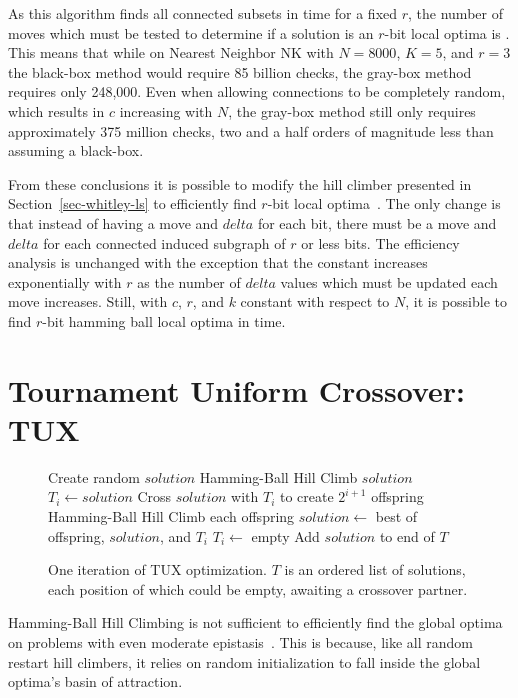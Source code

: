 As this algorithm finds all connected subsets in  time for a fixed $r$, the number of moves
which must be tested to determine if a solution is an $r$-bit local optima is . This means that
while on Nearest Neighbor NK with $N=8000$, $K=5$, and $r=3$ the black-box method would require 85 billion
checks, the gray-box method requires only 248,000. Even when allowing connections to be completely random,
which results in $c$ increasing with $N$, the gray-box method still only requires approximately 375 million checks,
two and a half orders of magnitude less than assuming a black-box.

From these conclusions it is possible to modify the hill climber presented in Section~\ref{sec-whitley-ls} to
efficiently find $r$-bit local optima~\cite{chicano:2014:ball}. The only change is that instead of having a move
and $delta$ for each bit, there must be a move and $delta$ for each connected induced subgraph of $r$ or less bits.
The efficiency analysis is unchanged with the exception that the constant increases exponentially with $r$ as
the number of $delta$ values which must be updated each move increases. Still, with $c$, $r$, and $k$ constant
with respect to $N$, it is possible to find $r$-bit hamming ball local optima in  time.

\section{Tournament Uniform Crossover: TUX}
\label{sec-tux}
\begin{figure}
  \begin{algorithmic}[1]
    \State Create random $solution$
    \State Hamming-Ball Hill Climb $solution$
        \State $T_i \leftarrow solution$
        \State \Return
      \EndIf
      \State Cross $solution$ with $T_i$ to create $2^{i+1}$ offspring
      \State Hamming-Ball Hill Climb each offspring
      \State $solution \leftarrow$ best of offspring, $solution$, and $T_i$
      \State $T_i \leftarrow$ empty
    \EndFor
    \State Add $solution$ to end of $T$
  \EndProcedure
\end{algorithmic}
  \caption{One iteration of TUX optimization. $T$ is an
           ordered list of solutions, each position of which could be empty,
           awaiting a crossover partner.}
  \label{fig-TUX}
\end{figure}

Hamming-Ball Hill Climbing is not sufficient to efficiently find the global optima
on problems with even moderate epistasis~\cite{chicano:2014:ball}. This is because,
like all random restart hill climbers, it relies on random initialization to fall
inside the global optima's basin of attraction.

